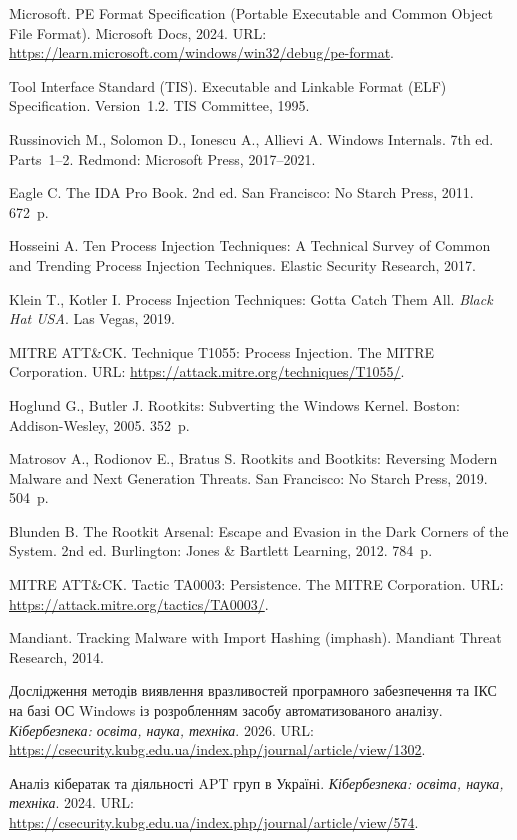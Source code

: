 
 Microsoft. PE Format Specification (Portable Executable and Common Object File Format). Microsoft Docs, 2024. URL: \url{https://learn.microsoft.com/windows/win32/debug/pe-format}.

 Tool Interface Standard (TIS). Executable and Linkable Format (ELF) Specification. Version~1.2. TIS Committee, 1995.

 Russinovich M., Solomon D., Ionescu A., Allievi A. Windows Internals. 7th ed. Parts~1--2. Redmond: Microsoft Press, 2017--2021.

 Eagle C. The IDA Pro Book. 2nd ed. San Francisco: No Starch Press, 2011. 672~p.

 Hosseini A. Ten Process Injection Techniques: A Technical Survey of Common and Trending Process Injection Techniques. Elastic Security Research, 2017.

 Klein T., Kotler I. Process Injection Techniques: Gotta Catch Them All. \emph{Black Hat USA}. Las Vegas, 2019.

 MITRE ATT\&CK. Technique T1055: Process Injection. The MITRE Corporation. URL: \url{https://attack.mitre.org/techniques/T1055/}.

 Hoglund G., Butler J. Rootkits: Subverting the Windows Kernel. Boston: Addison-Wesley, 2005. 352~p.

 Matrosov A., Rodionov E., Bratus S. Rootkits and Bootkits: Reversing Modern Malware and Next Generation Threats. San Francisco: No Starch Press, 2019. 504~p.

 Blunden B. The Rootkit Arsenal: Escape and Evasion in the Dark Corners of the System. 2nd ed. Burlington: Jones \& Bartlett Learning, 2012. 784~p.

 MITRE ATT\&CK. Tactic TA0003: Persistence. The MITRE Corporation. URL: \url{https://attack.mitre.org/tactics/TA0003/}.

 Mandiant. Tracking Malware with Import Hashing (imphash). Mandiant Threat Research, 2014.

 Дослідження методів виявлення вразливостей програмного забезпечення та ІКС на базі ОС Windows із розробленням засобу автоматизованого аналізу. \emph{Кібербезпека: освіта, наука, техніка}. 2026. URL: \url{https://csecurity.kubg.edu.ua/index.php/journal/article/view/1302}.

 Аналіз кібератак та діяльності APT груп в Україні. \emph{Кібербезпека: освіта, наука, техніка}. 2024. URL: \url{https://csecurity.kubg.edu.ua/index.php/journal/article/view/574}.
